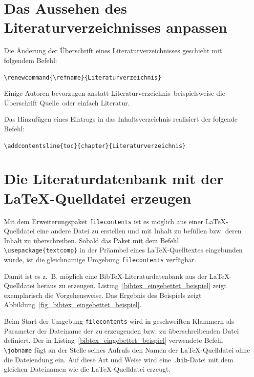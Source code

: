 \documentclass[a4paper,10pt,twoside]{scrbook}
\begin{document}
\section{Das Aussehen des Literaturverzeichnisses anpassen}
\label{Abschnitt_Literaturverzeichnis_anpassen}

Die Änderung der Überschrift eines Literaturverzeichnisses geschieht mit folgendem Befehl:

\begin{boxedminipage}{\textwidth}
\texttt{\textbackslash renewcommand\{\textbackslash refname\}\{Literaturverzeichnis\}}
\end{boxedminipage}

Einige Autoren bevorzugen anstatt \glqq Literaturverzeichnis\grqq\ beispielsweise die Überschrift \glqq Quelle\grqq\ oder einfach \grqq Literatur\grqq.

Das Hinzufügen eines Eintrags in das Inhaltsverzeichnis realisiert der folgende Befehl:


\begin{boxedminipage}{\textwidth}
\texttt{\textbackslash addcontentsline\{toc\}\{chapter\}\{Literaturverzeichnis\}}
\end{boxedminipage}




\section{Die Literaturdatenbank mit der \LaTeX-Quelldatei erzeugen}
\label{Abschnitt_Literaturdatenbank_Quelldatei_erzeugen}

Mit dem Erweiterungspaket \verb|filecontents| ist es möglich aus einer \LaTeX-Quelldatei eine andere Datei zu erstellen und mit Inhalt zu befüllen bzw. deren Inhalt zu überschreiben. Sobald das Paket mit dem Befehl \verb!\usepackage{textcomp}! in der Präambel eines \LaTeX-Quelltextes eingebunden wurde, ist die gleichnamige Umgebung \verb|filecontents| verfügbar.

Damit ist es z.~B. möglich eine Bib\TeX-Literaturdatenbank aus der \LaTeX-Quelldatei heraus zu erzeugen.
Listing~\ref{bibtex_eingebettet_beispiel} zeigt exemplarisch die Vorgehensweise. Das Ergebnis des
Beispiels zeigt Abbildung~\ref{fig_bibtex_eingebettet_beispiel}.

Beim Start der Umgebung \verb|filecontents| wird in geschweiften Klammern als Parameter der Dateiname der zu erzeugenden bzw. zu überschreibenden Datei definiert. Der in Listing~\ref{bibtex_eingebettet_beispiel} verwendete Befehl \verb|\jobname| fügt an der Stelle seines Aufrufs den Namen der \LaTeX-Quelldatei ohne die Dateiendung ein. Auf diese Art und Weise wird eine \verb|.bib|-Datei mit dem gleichen Dateinamen wie die \LaTeX-Quelldatei erzeugt.
\end{document}
